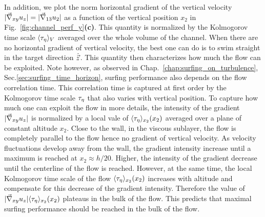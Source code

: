 In addition, we plot the norm horizontal gradient of the vertical velocity $\lvert\vec{\nabla}_{xy} u_{z}\rvert = \lvert\vec{\nabla}_{13} u_2\rvert$ as a function of the vertical position $x_2$ in Fig.~\ref{fig:channel_perf_y}\textbf{(c)}.
This quantity is normalized by the Kolmogorov time scale $\langle \tau_{\eta} \rangle_V$ averaged over the whole volume of the channel.
When there are no horizontal gradient of vertical velocity, the best one can do is to swim straight in the target direction $\hat{\vec{z}}$.
This quantity then characterizes how much the flow can be exploited.
Note however, as observed in Chap.~\ref{chap:surfing_on_turbulence}, Sec.\ref{sec:surfing_time_horizon}, surfing performance also depends on the flow correlation time.
This correlation time is captured at first order by the Kolmogorov time scale $\tau_{\eta}$ that also varies with vertical position.
To capture how much one can exploit the flow in more details, the intensity of the gradient $\lvert\vec{\nabla}_{xy} u_{z}\rvert$ is normalized by a local vale of $\langle \tau_{\eta} \rangle_{x_2}(x_2)$ averaged over a plane of constant altitude $x_2$.
Close to the wall, in the viscous sublayer, the flow is completely parallel to the flow hence no gradient of vertical velocity.
As velocity fluctuations develop away from the wall, the gradient intensity increase until a maximum is reached at $x_2 \approx h / 20$.
Higher, the intensity of the gradient decrease until the centerline of the flow is reached.
However, at the same time, the local Kolmogorov time scale of the flow $\langle \tau_{\eta} \rangle_{x_2}(x_2)$ increases with altitude and compensate for this decrease of the gradient intensity.
Therefore the value of $\lvert\vec{\nabla}_{xy} u_{z}\rvert \langle \tau_{\eta} \rangle_{x_2}(x_2)$ plateaus in the bulk of the flow.
This predicts that maximal surfing performance should be reached in the bulk of the flow.

